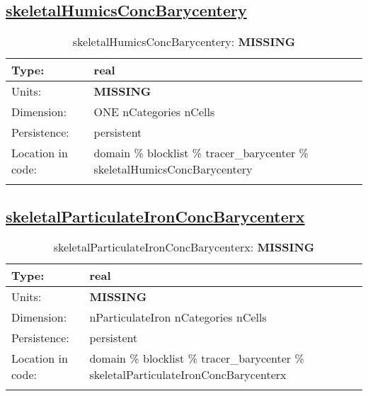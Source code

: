 \subsection[skeletalHumicsConcBarycentery]{\hyperref[sec:var_tab_tracer_barycenter]{skeletalHumicsConcBarycentery}}
\label{subsec:var_sec_tracer_barycenter_skeletalHumicsConcBarycentery}
\begin{center}
\begin{longtable}{| p{2.0in} | p{4.0in} |}
        \hline 
        Type: & real \\
        \hline 
        Units: & {\bf \color{red} MISSING} \\
        \hline 
        Dimension: & ONE nCategories nCells \\
        \hline 
        Persistence: & persistent \\
        \hline 
         Location in code: & domain \% blocklist \% tracer\_barycenter \% skeletalHumicsConcBarycentery \\
         \hline 
    \caption{skeletalHumicsConcBarycentery: {\bf \color{red} MISSING}}
\end{longtable}
\end{center}
\subsection[skeletalParticulateIronConcBarycenterx]{\hyperref[sec:var_tab_tracer_barycenter]{skeletalParticulateIronConcBarycenterx}}
\label{subsec:var_sec_tracer_barycenter_skeletalParticulateIronConcBarycenterx}
\begin{center}
\begin{longtable}{| p{2.0in} | p{4.0in} |}
        \hline 
        Type: & real \\
        \hline 
        Units: & {\bf \color{red} MISSING} \\
        \hline 
        Dimension: & nParticulateIron nCategories nCells \\
        \hline 
        Persistence: & persistent \\
        \hline 
         Location in code: & domain \% blocklist \% tracer\_barycenter \% skeletalParticulateIronConcBarycenterx \\
         \hline 
    \caption{skeletalParticulateIronConcBarycenterx: {\bf \color{red} MISSING}}
\end{longtable}
\end{center}
